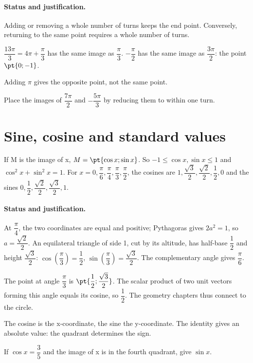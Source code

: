 \paragraph{Status and justification.} Adding or removing a whole number of turns keeps the end point. Conversely, returning to the same point requires a whole number of turns.
\begin{example}$\dfrac{13\pi}{3}=4\pi +\dfrac{\pi}{3}$ has the same image as $\dfrac{\pi}{3}$. $-\dfrac{\pi}{2}$ has the same image as $\dfrac{3\pi}{2}$: the point $\pt{0;-1}$.\end{example}\label{C10-EX2}
\begin{pitfall}Adding $\pi$ gives the opposite point, not the same point.\end{pitfall}
\begin{application}Place the images of $\dfrac{7\pi}{2}$ and $-\dfrac{5\pi}{3}$ by reducing them to within one turn.\end{application}\label{C10-AP2}
\section{Sine, cosine and standard values}\label{C10-U3}
\begin{keypoint}
If M is the image of x, $M=\pt{\cos x;\sin x}$. So $-1\leq\cos x,\sin x\leq1$ and $\cos^2x+\sin^2x=1$. For $x=0,\dfrac{\pi}{6},\dfrac{\pi}{4},\dfrac{\pi}{3},\dfrac{\pi}{2}$, the cosines are $1,\dfrac{\sqrt 3}{2},\dfrac{\sqrt 2}{2},\dfrac{1}{2},0$ and the sines $0,\dfrac{1}{2},\dfrac{\sqrt 2}{2},\dfrac{\sqrt 3}{2},1$.
\end{keypoint}
\paragraph{Status and justification.} At $\dfrac{\pi}{4}$, the two coordinates are equal and positive; Pythagoras gives $2a^2=1$, so $a=\dfrac{\sqrt 2}{2}$. An equilateral triangle of side 1, cut by its altitude, has half-base $\dfrac{1}{2}$ and height $\dfrac{\sqrt 3}{2}$: $\cos (\dfrac{\pi}{3})=\dfrac{1}{2}$, $\sin (\dfrac{\pi}{3})=\dfrac{\sqrt 3}{2}$. The complementary angle gives $\dfrac{\pi}{6}$.
\begin{example}The point at angle $\dfrac{\pi}{3}$ is $\pt{\dfrac{1}{2};\dfrac{\sqrt 3}{2}}$. The scalar product of two unit vectors forming this angle equals its cosine, so $\dfrac{1}{2}$. The geometry chapters thus connect to the circle.\end{example}\label{C10-EX3}
\begin{pitfall}The cosine is the x-coordinate, the sine the y-coordinate. The identity gives an absolute value: the quadrant determines the sign.\end{pitfall}
\begin{application}If $\cos x=\dfrac{3}{5}$ and the image of x is in the fourth quadrant, give $\sin x$.\end{application}\label{C10-AP3}
